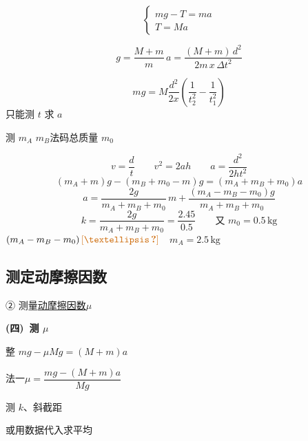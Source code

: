 \[
\begin{cases} mg-T=ma\\ T=Ma\end{cases}
\]

\[
g=\frac{M+m}{m}\,a=\frac{(M+m)\,d^2}{2m\,x\,\Delta t^2}
\]

\[
mg=M\frac{d^2}{2x}\left(\frac{1}{t_2^2}-\frac{1}{t_1^2}\right)
\]
只能测 $t$ 求 $a$

\begin{problem}
测 $m_A$ $m_B$\quad 法码总质量 $m_0$ %



\begin{solution}
\[ v=\frac{d}{t}\qquad v^2=2ah\qquad a=\frac{d^2}{2ht^2} \]
\[ (m_A+m)g-(m_B+m_0-m)g=(m_A+m_B+m_0)a \]
\[ a=\frac{2g}{m_A+m_B+m_0}\,m+\frac{(m_A-m_B-m_0)g}{m_A+m_B+m_0} \]
\[ k=\frac{2g}{m_A+m_B+m_0}=\frac{2.45}{0.5}\qquad\text{又 }m_0=0.5\,\mathrm{kg} \]
$(m_A-m_B-m_0)\,\unclear{…}$\ \ $m_A=2.5\,\mathrm{kg}$
\end{solution}
\end{problem}

\subsection{测定动摩擦因数}
② 测量\underline{动摩擦因数$\mu$}\  %

\textbf{(四)\ 测 $\mu$}


整 $mg-\mu Mg=(M+m)a$ %

法一\quad $\mu=\dfrac{mg-(M+m)a}{Mg}$


测 $k$、斜截距  %

或用数据代入求平均


